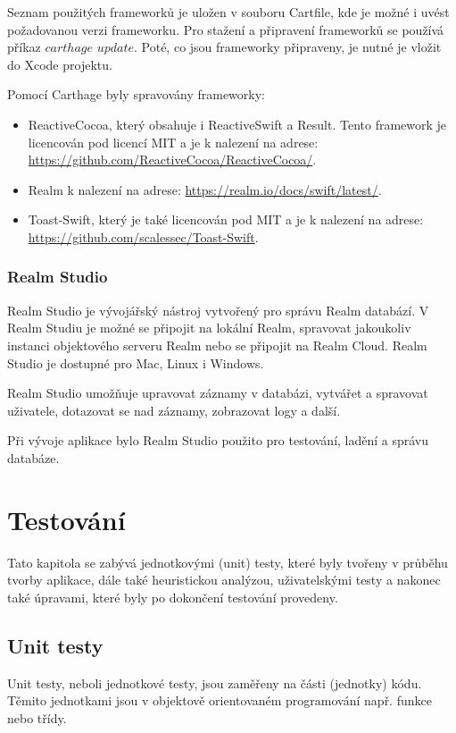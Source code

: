 \documentclass[thesis=M,czech]{FITthesis}[2012/06/26]
\begin{document}
Seznam použitých frameworků je uložen v souboru Cartfile, kde je možné i uvést požadovanou verzi frameworku. Pro stažení a připravení frameworků se používá příkaz $carthage$ $update$. Poté, co jsou frameworky připraveny, je nutné je vložit do Xcode projektu. \cite{carthage}

Pomocí Carthage byly spravovány frameworky:
\begin{itemize}
\item ReactiveCocoa, který obsahuje i ReactiveSwift a Result. Tento framework je licencován pod licencí MIT a je k nalezení na adrese:\\ \url{https://github.com/ReactiveCocoa/ReactiveCocoa/}.
\item Realm k nalezení na adrese: \url{https://realm.io/docs/swift/latest/}.
\item Toast-Swift, který je také licencován pod MIT a je k nalezení na adrese: \url{https://github.com/scalessec/Toast-Swift}.
\end{itemize}

\subsection{Realm Studio}
Realm Studio je vývojářský nástroj vytvořený pro správu Realm databází. V Realm Studiu je možné se připojit na lokální Realm, spravovat jakoukoliv instanci objektového serveru Realm nebo se připojit na Realm Cloud. Realm Studio je dostupné pro Mac, Linux i Windows. \cite{realmStudio}

Realm Studio umožňuje upravovat záznamy v databázi, vytvářet a spravovat uživatele, dotazovat se nad záznamy, zobrazovat logy a další. \cite{realmStudio}

Při vývoje aplikace bylo Realm Studio použito pro testování, ladění a správu databáze.

\chapter{Testování}
Tato kapitola se zabývá jednotkovými (unit) testy, které byly tvořeny v průběhu tvorby aplikace, dále také heuristickou analýzou, uživatelskými testy a nakonec také úpravami, které byly po dokončení testování provedeny.

\section{Unit testy}
Unit testy, neboli jednotkové testy, jsou zaměřeny na části (jednotky) kódu. Těmito jednotkami jsou v objektově orientovaném programování např. funkce nebo třídy. \cite{unitTesting}
\end{document}
